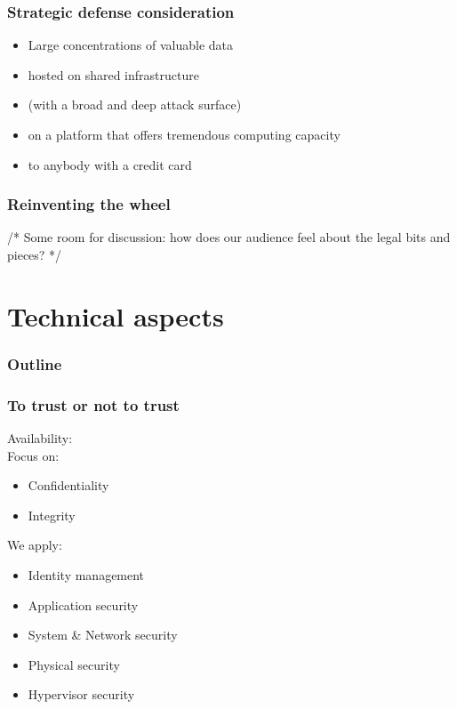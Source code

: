 \documentclass{beamer}
\begin{document}
\begin{frame}
    \frametitle{Strategic defense consideration}
    \begin{itemize}
      \item Large concentrations of valuable data
      \item hosted on shared infrastructure
      \item (with a broad and deep attack surface)
      \item on a platform that offers tremendous computing capacity
      \item to anybody with a credit card
    \end{itemize}
\end{frame}

\begin{frame}
    \frametitle{Reinventing the wheel}
    /* Some room for discussion: how does our audience feel about the legal
    bits and pieces? */
\end{frame}

\section{Technical aspects}

\begin{frame}
  \frametitle{Outline}
\end{frame}

\begin{frame}
    \frametitle{To trust or not to trust}

    Availability: \checkmark \\
    Focus on:
    \begin{itemize}
      \item Confidentiality
      \item Integrity
    \end{itemize}
    We apply:
    \begin{itemize} %
      \item Identity management
      \item Application security
      \item System \& Network security
      \item Physical security
      \item Hypervisor security %
    \end{itemize}
\end{frame}
\end{document}
